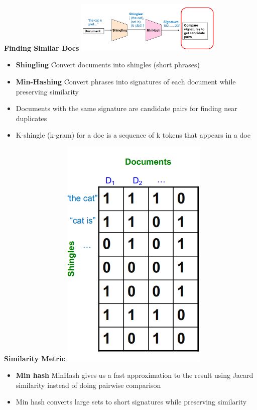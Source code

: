 \documentclass[10pt, landscape]{article}
\begin{document}
\begin{multicols}{4}
\textbf{Finding Similar Docs}
\includegraphics*[width=7cm]{shingling.png}
\begin{itemize}
  \item \textbf{Shingling} Convert documents into shingles (short phrases)
  \item \textbf{Min-Hashing} Convert phrases into signatures of each document while preserving similarity
  \item Documents with the same signature are candidate pairs for finding near duplicates
  \item K-shingle (k-gram) for a doc is a sequence of k tokens that appears in a doc 
\end{itemize}

\textbf{Similarity Metric}
\includegraphics*[width=7cm]{k-shingle.png}
\begin{itemize}
  \item \textbf{Min hash} MinHash gives us a fast approximation to the result using Jacard similarity instead of doing pairwise comparison
  \item Min hash converts large sets to short signatures while preserving similarity
\end{itemize}



\end{multicols}
\end{document}
